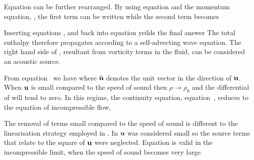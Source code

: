Equation  can be further rearranged.
By using equation  and the momentum equation, , the first term can be written
while the second term becomes

Inserting equations ,  and  back into equation  yeilds the final answer 
The total enthalpy therefore propagates according to a self-advecting wave equation.
The right hand side of , resultant from vorticity terms in the fluid, can be considered an acoustic source.

From equation~ we have
where $\hat {\textbf{u}}$ denotes the unit vector in the direction of $\textbf{u}$.
When $\textbf{u}$ is small compared to the speed of sound then $\rho \rightarrow \rho_0$
and the differential of will tend to zero.
In this regime, the continuity equation, equation~, reduces to the equation of incompressible flow,

The removal of terms small compared to the speed of sound is different to the linearisation strategy employed in .
In  $\textbf{u}$ was considered small so the source terms that relate to the square of $\textbf{u}$ were neglected.
Equation  is  valid in the incompressible limit,
when the speed of sound becomes very large.
  

